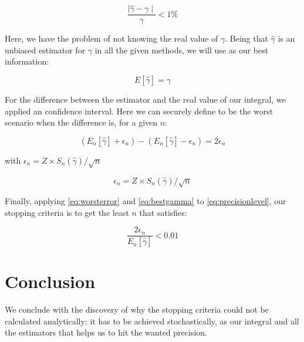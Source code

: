 \documentclass{article}
\begin{document}
\begin{equation}
    \frac{\mid\hat{\gamma}-\gamma\mid}{\gamma} < 1\%
\label{eq:precisionlevel}
\end{equation}

Here, we have the problem of not knowing the real value of $\gamma$. Being that $\hat{\gamma}$ is an unbiased estimator for $\gamma$ in all the given methods, we will use as our best information:

\begin{equation}
    E[\hat{\gamma}] = \gamma
\label{eq:bestgamma}
\end{equation}

For the difference between the estimator and the real value of our integral, we applied an confidence interval. Here we can securely define to be the worst scenario when the difference is, for a given $n$:

\begin{equation}
    (E_n[\hat{\gamma}] + \epsilon_n) - 
    (E_n[\hat{\gamma}] - \epsilon_n) =
    2 \epsilon_n
\label{eq:worsterror}
\end{equation}

\begin{center}
    with $\epsilon_n = Z \times S_n(\hat{\gamma})/\sqrt{n}$
\end{center}

\begin{equation}
    \epsilon_n = Z \times S_n(\hat{\gamma})/\sqrt{n}
\end{equation}


Finally, applying \ref{eq:worsterror} and \ref{eq:bestgamma} to \ref{eq:precisionlevel}, our stopping criteria is to get the least $n$ that satisfies:

\begin{equation}
    \frac{2 \epsilon_n}{E_n[\hat{\gamma}]} < 0.01
\label{eq:stoppingcriteria}
\end{equation}

\section{Conclusion}
We conclude with the discovery of why the stopping criteria could not be calculated analytically: it has to be achieved stochastically, as our integral and all the estimators that helps us to hit the wanted precision.

\end{document}
